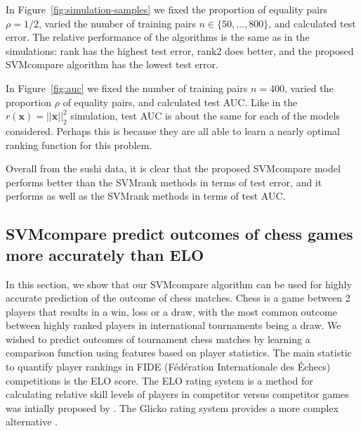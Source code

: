 \documentclass[twoside,11pt]{article}
\newcommand{\changed}[1]{
  #1
}
\begin{document}
In Figure~\ref{fig:simulation-samples} we fixed the proportion of
equality pairs $\rho=1/2$, varied the number of training pairs
$n\in\{50,\dots, 800\}$, and calculated test error. The relative
performance of the algorithms is the same as in the simulations: rank
has the highest test error, rank2 does better, and the proposed
SVMcompare algorithm has the lowest test error.

In Figure~\ref{fig:auc} we fixed the number of training pairs $n=400$,
varied the proportion $\rho$ of equality pairs, and calculated test
AUC. \changed{Like in the $r(\mathbf x)=||\mathbf x||_2^2$ simulation,
  test AUC is about the same for each of the models
  considered. Perhaps this is because they are all able to learn a
  nearly optimal ranking function for this problem.}

\changed{Overall from the sushi data, it is clear that the proposed SVMcompare
model performs better than the SVMrank methods in terms of test error,
and it performs as well as the SVMrank methods in terms of test AUC.
}

\subsection{SVMcompare predict outcomes of chess games more accurately than ELO}

In this section, we show that our SVMcompare algorithm can be used for
highly accurate prediction of the outcome of chess matches. Chess is a
game between 2 players that results in a win, loss or a draw, with the
most common outcome between highly ranked players in international
tournaments being a draw. We wished to predict outcomes of tournament
chess matches by learning a comparison function using features based
on player statistics.  The main statistic to quantify player rankings
in FIDE (Fédération Internationale des Échecs) competitions is the ELO
score.  The ELO rating system is a method for calculating relative
skill levels of players in competitor versus competitor games was
intially proposed by \citet{elo_score}.
The Glicko rating system 
provides a more complex alternative \citep{Glicko}.
\end{document}
